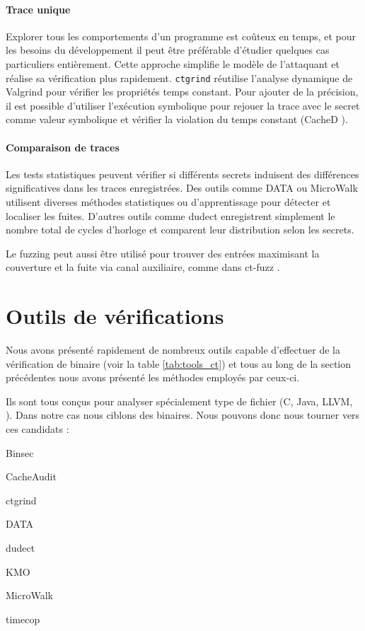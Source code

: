 \paragraph{Trace unique} Explorer tous les comportements d'un programme est coûteux en temps, et pour les besoins du développement il peut être préférable d'étudier quelques cas particuliers entièrement. Cette approche simplifie le modèle de l'attaquant et réalise sa vérification plus rapidement. \texttt{ctgrind} \cite{ctgrind} réutilise l'analyse dynamique de Valgrind pour vérifier les propriétés temps constant. Pour ajouter de la précision, il est possible d'utiliser l'exécution symbolique pour rejouer la trace avec le secret comme valeur symbolique et vérifier la violation du temps constant (CacheD \cite{CacheD}).

\paragraph{Comparaison de traces} Les tests statistiques peuvent vérifier si différents secrets induisent des différences significatives dans les traces enregistrées. Des outils comme DATA \cite{DATA1} ou MicroWalk \cite{MicroWalk} utilisent diverses méthodes statistiques ou d'apprentissage pour détecter et localiser les fuites. D'autres outils comme dudect \cite{dudect} enregistrent simplement le nombre total de cycles d'horloge et comparent leur distribution selon les secrets.

Le fuzzing peut aussi être utilisé pour trouver des entrées maximisant la couverture et la fuite via canal auxiliaire, comme dans ct-fuzz \cite{ctfuzz}.\medbreak


\section{Outils de vérifications}


Nous avons présenté rapidement de nombreux outils capable d'effectuer de la vérification de binaire (voir la table \ref{tab:tools_ct}) et tous au long de la section précédentes nous avons présenté les méthodes employés par ceux-ci. \medbreak

Ils sont tous conçus pour analyser spécialement type de fichier (C, Java, LLVM, \etc). Dans notre cas nous ciblons des binaires. Nous pouvons donc nous tourner vers ces candidats :
\begin{itemize}
\begin{multicols}{4}
  \item Binsec
  \item CacheAudit
  \item ctgrind
  \item DATA
  \item dudect
  \item KMO
  \item MicroWalk
  \item timecop
\end{multicols}
\end{itemize}

